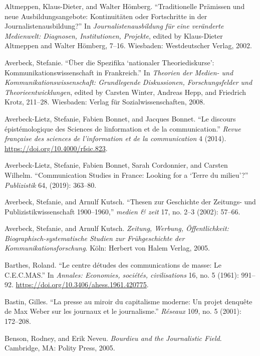 \documentclass{tufte-handout}
\begin{document}
\begin{hangparas}{.25in}{1} 



Altmeppen, Klaus-Dieter, and Walter Hömberg. ``Traditionelle Prämissen
und neue Ausbildungsangebote: Kontinuitäten oder Fortschritte in der
Journalistenausbildung?'' In \emph{Journalistenausbildung für eine
veränderte Medienwelt: Diagnosen, Institutionen, Projekte}, edited by
Klaus-Dieter Altmeppen and Walter Hömberg, 7--16. Wiesbaden:
Westdeutscher Verlag, 2002.

Averbeck, Stefanie. ``Über die Spezifika `nationaler Theoriediskurse':
Kommunikationswissenschaft in Frankreich.'' In \emph{Theorien der
Medien- und Kommunikationswissenschaft: Grundlegende Diskussionen,
Forschungsfelder und Theorieentwicklungen}, edited by Carsten Winter,
Andreas Hepp, and Friedrich Krotz, 211--28. Wiesbaden: Verlag für
Sozialwissenschaften, 2008.

Averbeck-Lietz, Stefanie, Fabien Bonnet, and Jacques Bonnet. ``Le
discours épistémologique des Sciences de l\textquotesingle information
et de la communication.'' \emph{Revue française des sciences de
l'information et de la communication} 4 (2014).
\url{https://doi.org/10.4000/rfsic.823}.

Averbeck-Lietz, Stefanie, Fabien Bonnet, Sarah Cordonnier, and Carsten
Wilhelm. ``Communication Studies in France: Looking for a `Terre du
milieu'?'' \emph{Publizistik} 64, (2019): 363--80.

Averbeck, Stefanie, and Arnulf Kutsch. ``Thesen zur Geschichte der
Zeitungs- und Publizistikwissenschaft 1900--1960,'' \emph{medien \&
zeit} 17, no. 2--3 (2002): 57--66.

Averbeck, Stefanie, and Arnulf Kutsch. \emph{Zeitung, Werbung,
Öffentlichkeit: Biographisch-systematische Studien zur Frühgeschichte
der Kommunikationsforschung}. Köln: Herbert von Halem Verlag, 2005.

Barthes, Roland. ``Le centre d\textquotesingle études des communications
de masse: Le C.E.C.MAS.'' In \emph{Annales: Economies, sociétés,
civilisations} 16, no. 5 (1961): 991--92.
\url{https://doi.org/10.3406/ahess.1961.420775}.

Bastin, Gilles. ``La presse au miroir du capitalisme moderne: Un projet
d\textquotesingle enquête de Max Weber sur les journaux et le
journalisme.'' \emph{Réseaux} 109, no. 5 (2001): 172--208.

Benson, Rodney, and Erik Neveu. \emph{Bourdieu and the Journalistic
Field}. Cambridge, MA: Polity Press, 2005.


\end{hangparas}
\end{document}
